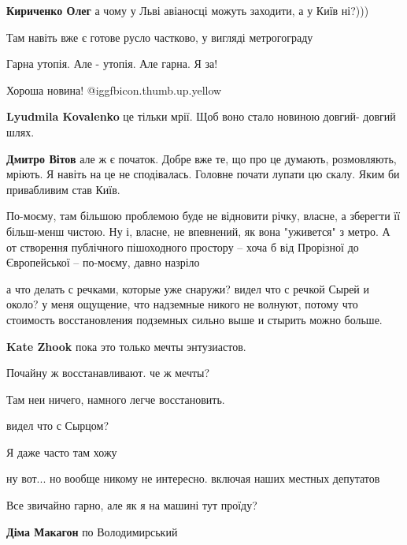 \begin{itemize}
\textbf{Кириченко Олег} а чому у Льві авіаносці можуть заходити, а у Київ ні?)))

Там навіть вже є готове русло частково, у вигляді метрогограду

Гарна утопія. Але - утопія. Але гарна. Я за!

Хороша новина!  @igg{fbicon.thumb.up.yellow} 

\begin{itemize} %
\textbf{Lyudmila Kovalenko} це тільки мрії. Щоб воно стало новиною довгий- довгий шлях.

\textbf{Дмитро Вітов} але ж є початок. Добре вже те, що про це думають, розмовляють, мріють. Я навіть на це не сподівалась. Головне почати лупати цю скалу. Яким би привабливим став Київ.
\end{itemize} %

По-моєму, там більшою проблемою буде не відновити річку, власне, а зберегти її більш-менш чистою.
Ну і, власне, не впевнений, як вона "уживется" з метро.
А от створення публічного пішоходного простору – хоча б від Прорізної до Європейської – по-моєму, давно назріло


а что делать с речками, которые уже снаружи? видел что с речкой Сырей и около?
у меня ощущение, что надземные никого не волнуют, потому что стоимость
восстановления подземных сильно выше и стырить можно больше.

\begin{itemize} %
\textbf{Kate Zhook} пока это только мечты энтузиастов.

Почайну ж восстанавливают. че ж мечты?

Там неи ничего, намного легче восстановить.

видел что с Сырцом?

Я даже часто там хожу

ну вот... но вообще никому не интересно. включая наших местных депутатов
\end{itemize} %

Все звичайно гарно, але як я на машині тут проїду?

\begin{itemize} %
\textbf{Діма Макагон} по Володимирський


\end{itemize}
\end{itemize}
